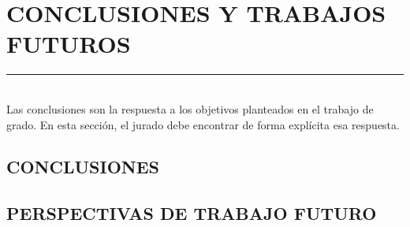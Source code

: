 \section{CONCLUSIONES Y TRABAJOS FUTUROS}
\rule{\textwidth}{1pt}\\

Las conclusiones son la respuesta a los objetivos planteados en el trabajo de grado. En esta sección, el jurado debe encontrar de forma explícita esa respuesta.
\subsection{CONCLUSIONES}
\lipsum[1]
\subsection{PERSPECTIVAS DE TRABAJO FUTURO }
\lipsum[1]
\newpage